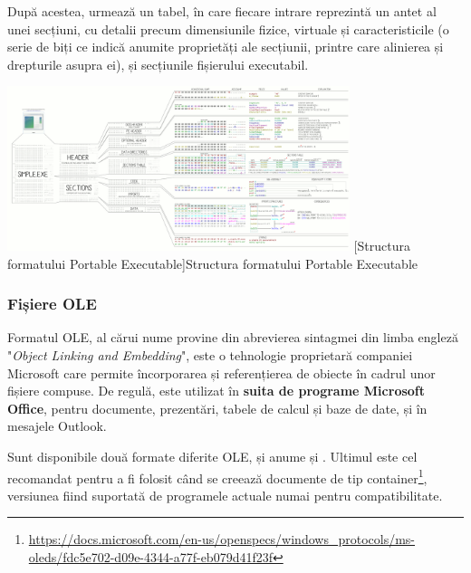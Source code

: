\documentclass[../../main.tex]{subfiles}
\begin{document}
După acestea, urmează un tabel, în care fiecare intrare reprezintă un antet al unei secțiuni, cu detalii precum dimensiunile fizice, virtuale și caracteristicile (o serie de biți ce indică anumite proprietăți ale secțiunii, printre care alinierea și drepturile asupra ei), și secțiunile fișierului executabil.

\vspace{0.3cm}
\begin{center}
    \includegraphics[width=10cm]{components/images/illustrations/pe.png}
    \label{fig:pe}
    \captionsetup{justification=centering,margin=1cm}
    [Structura formatului Portable Executable]{Structura formatului Portable Executable\footnotemark}
\end{center}
\vspace{0.3cm}


\subsubsection{Fișiere OLE}

Formatul OLE, al cărui nume provine din abrevierea sintagmei din limba engleză "\textit{Object Linking and Embedding}", este o tehnologie proprietară companiei Microsoft care permite încorporarea și referențierea de obiecte în cadrul unor fișiere compuse. De regulă, este utilizat în \textbf{suita de programe Microsoft Office}, pentru documente, prezentări, tabele de calcul și baze de date, și în mesajele Outlook.

Sunt disponibile două formate diferite OLE, și anume  și . Ultimul este cel recomandat pentru a fi folosit când se creează documente de tip container\footnote{\href{https://docs.microsoft.com/en-us/openspecs/windows_protocols/ms-oleds/fdc5e702-d09e-4344-a77f-eb079d41f23f}{https://docs.microsoft.com/en-us/openspecs/windows\_protocols/ms-oleds/fdc5e702-d09e-4344-a77f-eb079d41f23f}}, versiunea  fiind suportată de programele actuale numai pentru compatibilitate.
\end{document}
